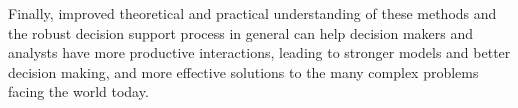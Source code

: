     Finally, improved theoretical and practical understanding of these methods and the robust decision support process in general can help decision makers and analysts have more productive interactions, leading to stronger models and better decision making, and more effective solutions to the many complex problems facing the world today. 
    
    
